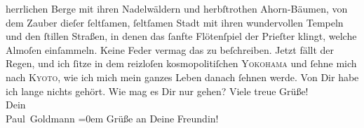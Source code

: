 \begin{ledgroupsized}[t]{13cm}
               herrlichen Berge mit ihren Nadelwäldern und herbſtrothen Ahorn-Bäumen, von dem {\pb}Zauber dieſer ſeltſamen, ſeltſamen Stadt mit ihren wundervollen  Tempeln und den ſtillen Straßen, in denen
               das ſanfte Flötenſpiel der Prieſter klingt, welche Almoſen einſammeln. Keine Feder
               vermag das zu beſchreiben. Jetzt fällt der Regen, und ich ſitze in dem reizloſen
               kosmopolitiſchen \textsc{Yokohama} und ſehne mich nach \textsc{Kyoto}, wie ich mich mein ganzes Leben danach ſehnen werde.\pend
           \pstart
           Von Dir habe ich lange nichts gehört. Wie mag es Dir nur gehen?\pend
           \pstart
           Viele treue Grüße! {\\[\baselineskip]}Dein {\\[\baselineskip]}\spacefill\mbox{Paul Goldmann}\pend
           \leftskip=0em{}\pstart
           \noindent{}Grüße an Deine Freundin!\pend
           
         
         \endnumbering{}\end{ledgroupsized}  \newcommand{\dateiname}{L02864}\newcommand{\titel}{Paul Goldmann an Arthur Schnitzler, 3. 11. [1898]}\newcommand{\editorInnen}{Martin Anton Müller und Laura Untner}
      
